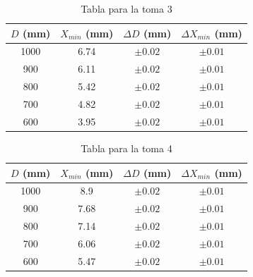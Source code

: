 \documentclass[11pt, a4paper, twocolumn]{article}
\begin{document}
\vspace{0.5cm}

\begin{table}[H]
    \caption{Tabla para la toma 3 }
    \centering
    \small
    \setlength{\tabcolsep}{4pt}
    \begin{tabular}{cccc}
        \hline        
        $D$ (mm) &   $X_{min}$ (mm) & $\Delta D$ (mm)   & $\Delta X_{min}$ (mm)  \\
        \hline
            1000 &       6.74  & $\pm 0.02$        & $\pm 0.01$\\
            900 &       6.11 & $\pm 0.02$        & $\pm 0.01$\\
            800 &       5.42 & $\pm 0.02$        & $\pm 0.01$\\
            700 &       4.82 & $\pm 0.02$        & $\pm 0.01$\\
            600 &       3.95 & $\pm 0.02$        & $\pm 0.01$\\
        \hline
    \end{tabular}

\end{table}

\vspace{0.5cm}

\begin{table}[H]
    \caption{Tabla para la toma 4 }
    \centering
    \small
    \setlength{\tabcolsep}{4pt}
    \begin{tabular}{cccc}
        \hline
        $D$ (mm) &   $X_{min}$ (mm) & $\Delta D$ (mm)   & $\Delta X_{min}$ (mm)  \\
        \hline
            1000 &       8.9   & $\pm 0.02$   & $\pm 0.01$ \\
            900 &       7.68  & $\pm 0.02$    & $\pm 0.01$ \\
            800 &       7.14  & $\pm 0.02$    & $\pm 0.01$ \\
            700 &       6.06  & $\pm 0.02$    & $\pm 0.01$ \\
            600 &       5.47 & $\pm 0.02$    & $\pm 0.01$ \\
        \hline
    \end{tabular}
\end{table}

\vspace{0.5cm}
\end{document}
